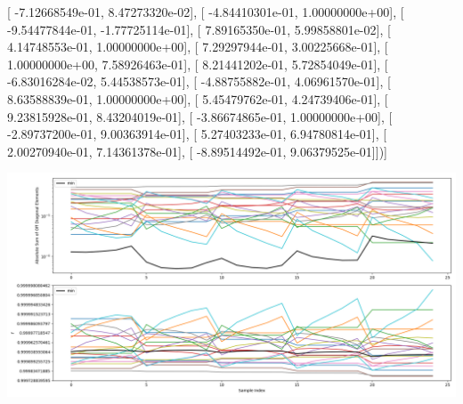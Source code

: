 \documentclass{article}
\begin{document}
       [ -7.12668549e-01,   8.47273320e-02],
       [ -4.84410301e-01,   1.00000000e+00],
       [ -9.54477844e-01,  -1.77725114e-01],
       [  7.89165350e-01,   5.99858801e-02],
       [  4.14748553e-01,   1.00000000e+00],
       [  7.29297944e-01,   3.00225668e-01],
       [  1.00000000e+00,   7.58926463e-01],
       [  8.21441202e-01,   5.72854049e-01],
       [ -6.83016284e-02,   5.44538573e-01],
       [ -4.88755882e-01,   4.06961570e-01],
       [  8.63588839e-01,   1.00000000e+00],
       [  5.45479762e-01,   4.24739406e-01],
       [  9.23815928e-01,   8.43204019e-01],
       [ -3.86674865e-01,   1.00000000e+00],
       [ -2.89737200e-01,   9.00363914e-01],
       [  5.27403233e-01,   6.94780814e-01],
       [  2.00270940e-01,   7.14361378e-01],
       [ -8.89514492e-01,   9.06379525e-01]])]
\begin{center}
\includegraphics[scale=.9]{report_pickled_controls222/control_dpn_all.png}

\end{center}
\end{document}
